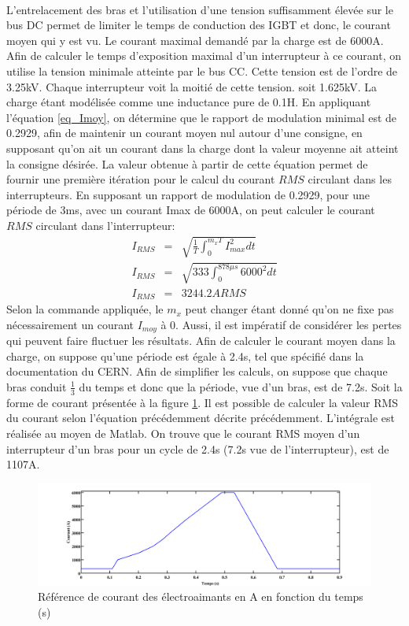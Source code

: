 \documentclass[11pt,letterpaper,final]{report}
\begin{document}
\paragraph{}L'entrelacement des bras et l'utilisation d'une tension suffisamment élevée sur le bus DC permet de limiter le temps de conduction des IGBT et donc, le courant moyen qui y est vu. Le courant maximal demandé par la charge est de 6000A. Afin de calculer le temps d'exposition maximal d'un interrupteur à ce courant, on utilise la tension minimale atteinte par le bus CC. Cette tension est de l'ordre de 3.25kV. Chaque interrupteur voit la moitié de cette tension. soit 1.625kV. La charge étant modélisée comme une inductance pure de 0.1H. En appliquant l'équation \ref{eq_Imoy}, on détermine que le rapport de modulation minimal est de 0.2929, afin de maintenir un courant moyen nul autour d'une consigne, en supposant qu'on ait un courant dans la charge dont la valeur moyenne ait atteint la consigne désirée. La valeur obtenue à partir de cette équation permet de fournir une première itération pour le calcul du courant $RMS$ circulant dans les interrupteurs. En supposant un rapport de modulation de 0.2929, pour une période de 3ms, avec un courant Imax de 6000A, on peut calculer le courant $RMS$ circulant dans l'interrupteur:
\begin{eqnarray}
I_{RMS} &=& \sqrt{\frac{1}{T}\int_0^{m_xT}I_{max}^2 dt}\\
I_{RMS} &=& \sqrt{333\int_0^{878\mu s}6000^2 dt}\\
I_{RMS} &=& 3244.2A RMS
\end{eqnarray}
Selon la commande appliquée, le $m_x$ peut changer étant donné qu'on ne fixe pas nécessairement un courant $I_{moy}$ à 0. Aussi, il est impératif de considérer les pertes qui peuvent faire fluctuer les résultats. Afin de calculer le courant moyen dans la charge, on suppose qu'une période est égale à 2.4s, tel que spécifié dans la documentation du CERN. Afin de simplifier les calculs, on suppose que chaque bras conduit $\frac{1}{3}$ du temps et donc que la période, vue d'un bras, est de 7.2s. Soit la forme de courant présentée à la figure \ref{fig_ref_courant}. Il est possible de calculer la valeur RMS du courant selon l'équation précédemment décrite précédemment. L'intégrale est réalisée au moyen de Matlab. On trouve que le courant RMS moyen d'un interrupteur d'un bras pour un cycle de 2.4s (7.2s vue de l'interrupteur), est de 1107A. 

\begin{figure}[htb]
\centering
\includegraphics[scale=0.4]{fig_ref_courant.png}
\caption{Référence de courant des électroaimants en A en fonction du temps (s)}
\label{fig_ref_courant}
\end{figure}
\end{document}
